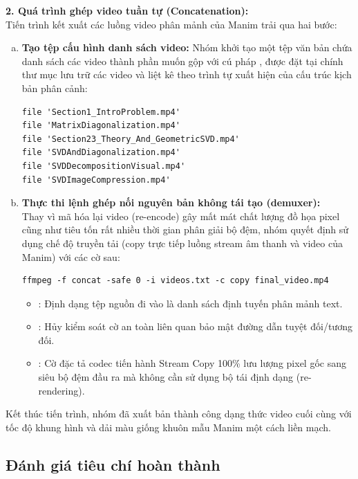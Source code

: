 \documentclass[a4paper]{article}
\begin{document}
\textbf{2. Quá trình ghép video tuần tự (Concatenation):}\\
Tiến trình kết xuất các luồng video phân mảnh của Manim trải qua hai bước:
\begin{enumerate}[(a)]
    \item \textbf{Tạo tệp cấu hình danh sách video:} Nhóm khởi tạo một tệp văn bản  chứa danh sách các video thành phần muốn gộp với cú pháp , được đặt tại chính thư mục lưu trữ các video và liệt kê theo trình tự xuất hiện của cấu trúc kịch bản phân cảnh:
\begin{lstlisting}[style=terminalstyle]
file 'Section1_IntroProblem.mp4'
file 'MatrixDiagonalization.mp4'
file 'Section23_Theory_And_GeometricSVD.mp4'
file 'SVDAndDiagonalization.mp4'
file 'SVDDecompositionVisual.mp4'
file 'SVDImageCompression.mp4'
\end{lstlisting}

    \item \textbf{Thực thi lệnh ghép nối nguyên bản không tái tạo (demuxer):}\\Thay vì mã hóa lại video (re-encode) gây mất mát chất lượng đồ họa pixel cũng như tiêu tốn rất nhiều thời gian phân giải bộ đệm, nhóm quyết định sử dụng chế độ truyền tải  (copy trực tiếp luồng stream âm thanh và video của Manim) với các cờ sau:
\begin{lstlisting}[style=terminalstyle]
ffmpeg -f concat -safe 0 -i videos.txt -c copy final_video.mp4
\end{lstlisting}
    \begin{itemize}
        \item {}: Định dạng tệp nguồn đi vào là danh sách định tuyến phân mảnh text.
        \item {}: Hủy kiểm soát cờ an toàn liên quan bảo mật đường dẫn tuyệt đối/tương đối.
        \item {}: Cờ đặc tả codec tiến hành Stream Copy 100\% lưu lượng pixel gốc sang siêu bộ đệm đầu ra  mà không cần sử dụng bộ tái định dạng (re-rendering).
    \end{itemize}
\end{enumerate}
Kết thúc tiến trình, nhóm đã xuất bản thành công dạng thức video cuối cùng với tốc độ khung hình và dải màu giống khuôn mẫu Manim một cách liền mạch.

\subsection{Đánh giá tiêu chí hoàn thành}
\end{document}
